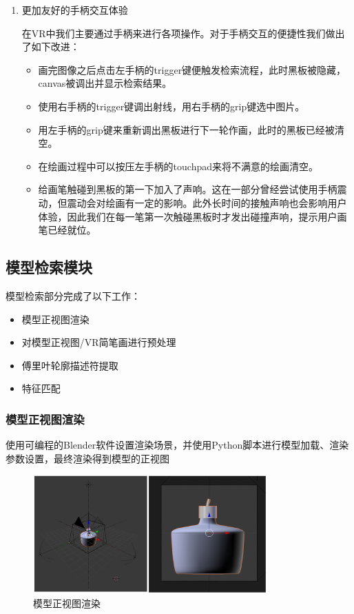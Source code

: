 \documentclass{article}
\begin{document}
\begin{enumerate}
    \item 更加友好的手柄交互体验
    
    \qquad 在VR中我们主要通过手柄来进行各项操作。对于手柄交互的便捷性我们做出了如下改进：
     \begin{itemize}
        \item 画完图像之后点击左手柄的trigger键便触发检索流程，此时黑板被隐藏，canvas被调出并显示检索结果。
        \item 使用右手柄的trigger键调出射线，用右手柄的grip键选中图片。
        \item 用左手柄的grip键来重新调出黑板进行下一轮作画，此时的黑板已经被清空。
        \item 在绘画过程中可以按压左手柄的touchpad来将不满意的绘画清空。
        \item 给画笔触碰到黑板的第一下加入了声响。这在一部分曾经尝试使用手柄震动，但震动会对绘画有一定的影响。此外长时间的接触声响也会影响用户体验，因此我们在每一笔第一次触碰黑板时才发出碰撞声响，提示用户画笔已经就位。
    \end{itemize}
    
\end{enumerate}
\subsection{模型检索模块}
模型检索部分完成了以下工作：
\begin{itemize}
    \item 模型正视图渲染
    \item 对模型正视图/VR简笔画进行预处理
    \item 傅里叶轮廓描述符提取
    \item 特征匹配
\end{itemize}

\subsubsection{模型正视图渲染}
使用可编程的Blender软件设置渲染场景，并使用Python脚本进行模型加载、渲染参数设置，最终渲染得到模型的正视图

\begin{figure}[htb]
    \centering
    \includegraphics[width=0.8\textwidth]{images/Blender.png}
    \caption{模型正视图渲染}\label{fig:digit}
\end{figure} 
    
\end{document}
